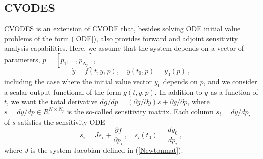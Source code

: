 \subsection{CVODES}\label{ss:cvodes}

CVODES is an extension of CVODE that, besides solving ODE initial
value problems of the form (\ref{ODE}), also provides forward and
adjoint sensitivity analysis capabilities.
%
Here, we assume that the system depends on a vector of parameters,
$p = [p_1,\ldots,p_{N_p}]$,
\begin{equation}\label{e:ODE_with_p}
\dot{y} = f(t,y,p), \quad y(t_0,p) = y_0(p) \, ,
\end{equation}
including the case where the initial value vector $y_0$ depends on $p$,
and we consider a scalar output functional of the form $g(t,y,p)$.
%
In addition to $y$ as a function of $t$, we want the total derivative
$d g / d p  = ({\partial g}/{\partial y}) s + {\partial g}/{\partial p}$,
where $s = dy/dp \in R^{N \times N_p}$ is the so-called sensitivity matrix.
%
Each column $s_i = d y / d p_i$ of $s$ satisfies the sensitivity ODE
\begin{equation}\label{e:fwdODE}
\dot{s}_i = J s_i + \frac{\partial f}{\partial p_i} \, ,
\quad s_i(t_0) = \frac{d y_0}{d p_i} \, ,
\end{equation}
where $J$ is the system Jacobian defined in (\ref{Newtonmat}).

